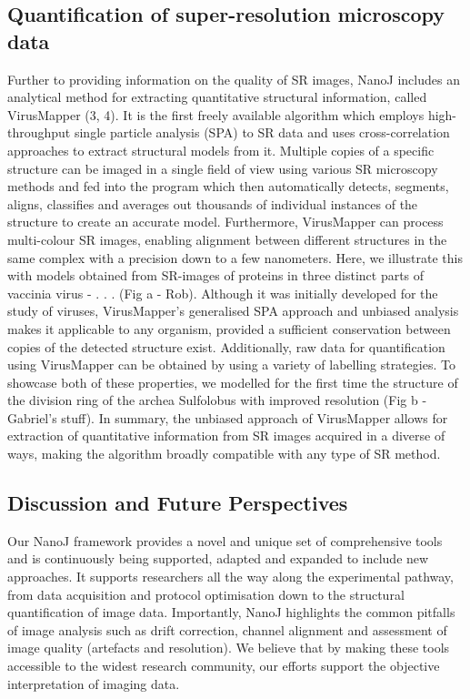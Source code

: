 \subsection*{Quantification of super-resolution microscopy data}
Further to providing information on the quality of SR images, NanoJ includes an analytical method for extracting quantitative structural information, called VirusMapper (3, 4).  It is the first freely available algorithm which employs high-throughput single particle analysis (SPA) to SR data and uses cross-correlation approaches to extract structural models from it. Multiple copies of a specific structure can be imaged in a single field of view using various SR microscopy methods and fed into the program which then automatically detects, segments, aligns, classifies and averages out thousands of individual instances of the structure to create an accurate model. Furthermore, VirusMapper can process multi-colour SR images, enabling alignment between different structures in the same complex with a precision down to a few nanometers. Here, we illustrate this with models obtained from SR-images of proteins in three distinct parts of vaccinia virus - . . . (Fig a - Rob). Although it was initially developed for the study of viruses, VirusMapper’s generalised SPA approach and unbiased analysis makes it applicable to any organism, provided a sufficient conservation between copies of the detected structure exist. Additionally, raw data for quantification using VirusMapper can be obtained by using a variety of labelling strategies. To showcase both of these properties, we modelled for the first time the structure of the division ring of the archea Sulfolobus with improved resolution (Fig b -Gabriel’s stuff). In summary, the unbiased approach of VirusMapper allows for extraction of quantitative information from SR images acquired in a diverse of ways,  making the algorithm broadly compatible with any type of SR method.

\subsection*{Discussion and Future Perspectives}
Our NanoJ framework provides a novel and unique set of comprehensive tools and is continuously being supported, adapted and expanded to include new approaches. It supports researchers all the way along the experimental pathway, from data acquisition and protocol optimisation down to the structural quantification of image data. 
Importantly, NanoJ highlights the common pitfalls of image analysis such as drift correction, channel alignment and assessment of image quality (artefacts and resolution). We believe that by making these tools accessible to the widest research community, our efforts support the objective interpretation of imaging data.

